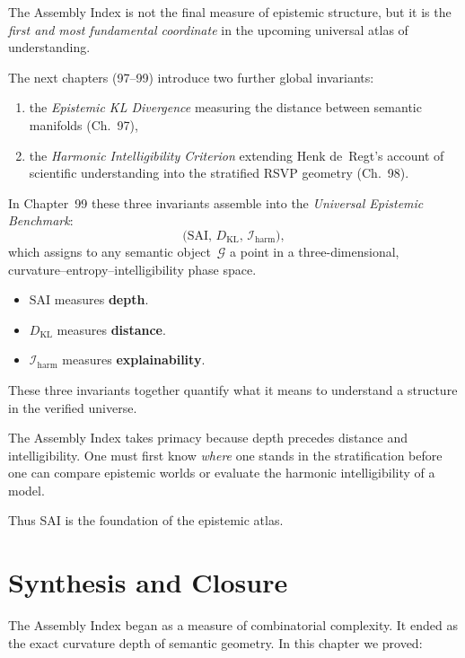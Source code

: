 The Assembly Index is not the final measure of epistemic structure,  
but it is the \emph{first and most fundamental coordinate} in the upcoming
universal atlas of understanding.

The next chapters (97–99) introduce two further global invariants:

\begin{enumerate}
  \item the \emph{Epistemic KL Divergence}  
    measuring the distance between semantic manifolds (Ch.~97),
  \item the \emph{Harmonic Intelligibility Criterion}  
    extending Henk de~Regt’s account of scientific understanding into the
    stratified RSVP geometry (Ch.~98).
\end{enumerate}

In Chapter~99 these three invariants assemble into the  
\emph{Universal Epistemic Benchmark}:
\[
\bigl(\mathrm{SAI},\, D_{\mathrm{KL}},\, \mathcal{I}_{\mathrm{harm}}\bigr),
\]
which assigns to any semantic object~$\mathcal{G}$ a point in a
three-dimensional, curvature–entropy–intelligibility phase space.

\begin{itemize}
  \item $\mathrm{SAI}$ measures \textbf{depth}.  
  \item $D_{\mathrm{KL}}$ measures \textbf{distance}.  
  \item $\mathcal{I}_{\mathrm{harm}}$ measures \textbf{explainability}.
\end{itemize}

These three invariants together quantify what it means to understand a
structure in the verified universe.

The Assembly Index takes primacy because depth precedes distance and
intelligibility.
One must first know \emph{where} one stands in the stratification before one
can compare epistemic worlds or evaluate the harmonic intelligibility of a
model.

Thus SAI is the foundation of the epistemic atlas.



\section{Synthesis and Closure}

The Assembly Index began as a measure of combinatorial complexity.
It ended as the exact curvature depth of semantic geometry.
In this chapter we proved:

